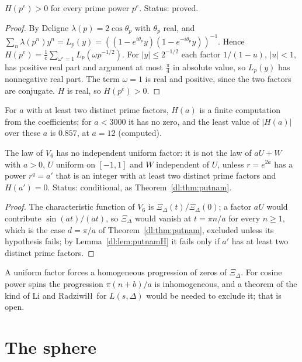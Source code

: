 \begin{lemma}\label{dl:lem:putnamH}
$H(p^e)>0$ for every prime power $p^e$. Status: proved.
\end{lemma}

\begin{proof}
By Deligne \cite{Deligne74} $\lambda(p)=2\cos\theta_p$ with $\theta_p$ real, and $\sum_n\lambda(p^n)y^n=L_p(y)=((1-e^{i\theta_p}y)(1-e^{-i\theta_p}y))^{-1}$. Hence $H(p^e)=\frac1e\sum_{\omega^e=1}L_p(\omega p^{-1/2})$. For $|y|\le2^{-1/2}$ each factor $1/(1-u)$, $|u|<1$, has positive real part and argument at most $\frac\pi4$ in absolute value, so $L_p(y)$ has nonnegative real part. The term $\omega=1$ is real and positive, since the two factors are conjugate. $H$ is real, so $H(p^e)>0$.
\end{proof}

For $a$ with at least two distinct prime factors, $H(a)$ is a finite computation from the coefficients; for $a<3000$ it has no zero, and the least value of $|H(a)|$ over these $a$ is $0.857$, at $a=12$ (computed).

\begin{corollary}\label{dl:cor:putnam}
The law of $V_6$ has no independent uniform factor: it is not the law of $aU+W$ with $a>0$, $U$ uniform on $[-1,1]$ and $W$ independent of $U$, unless $r=e^{2a}$ has a power $r^q=a'$ that is an integer with at least two distinct prime factors and $H(a')=0$. Status: conditional, as Theorem~\ref{dl:thm:putnam}.
\end{corollary}

\begin{proof}
The characteristic function of $V_6$ is $\Xi_\Delta(t)/\Xi_\Delta(0)$; a factor $aU$ would contribute $\sin(at)/(at)$, so $\Xi_\Delta$ would vanish at $t=\pi n/a$ for every $n\ge1$, which is the case $d=\pi/a$ of Theorem~\ref{dl:thm:putnam}, excluded unless its hypothesis fails; by Lemma~\ref{dl:lem:putnamH} it fails only if $a'$ has at least two distinct prime factors.
\end{proof}

A uniform factor forces a homogeneous progression of zeros of $\Xi_\Delta$. For cosine power spins the progression $\pi(n+b)/a$ is inhomogeneous, and a theorem of the kind of Li and Radziwi\l\l\ for $L(s,\Delta)$ would be needed to exclude it; that is open.

\section{The sphere}\label{dl:sec:sphere}

